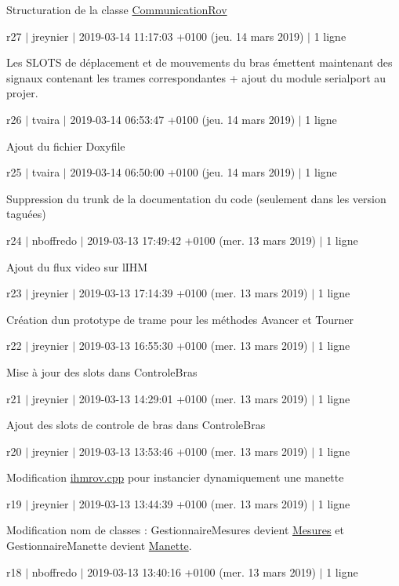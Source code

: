 Structuration de la classe \hyperlink{class_communication_rov}{Communication\+Rov}

r27 $\vert$ jreynier $\vert$ 2019-\/03-\/14 11\+:17\+:03 +0100 (jeu. 14 mars 2019) $\vert$ 1 ligne

Les S\+L\+O\+TS de déplacement et de mouvements du bras émettent maintenant des signaux contenant les trames correspondantes + ajout du module serialport au projer.

r26 $\vert$ tvaira $\vert$ 2019-\/03-\/14 06\+:53\+:47 +0100 (jeu. 14 mars 2019) $\vert$ 1 ligne

Ajout du fichier Doxyfile

r25 $\vert$ tvaira $\vert$ 2019-\/03-\/14 06\+:50\+:00 +0100 (jeu. 14 mars 2019) $\vert$ 1 ligne

Suppression du trunk de la documentation du code (seulement dans les version taguées)

r24 $\vert$ nboffredo $\vert$ 2019-\/03-\/13 17\+:49\+:42 +0100 (mer. 13 mars 2019) $\vert$ 1 ligne

Ajout du flux video sur l\textquotesingle{}I\+HM

r23 $\vert$ jreynier $\vert$ 2019-\/03-\/13 17\+:14\+:39 +0100 (mer. 13 mars 2019) $\vert$ 1 ligne

Création d\textquotesingle{}un prototype de trame pour les méthodes Avancer et Tourner

r22 $\vert$ jreynier $\vert$ 2019-\/03-\/13 16\+:55\+:30 +0100 (mer. 13 mars 2019) $\vert$ 1 ligne

Mise à jour des slots dans Controle\+Bras

r21 $\vert$ jreynier $\vert$ 2019-\/03-\/13 14\+:29\+:01 +0100 (mer. 13 mars 2019) $\vert$ 1 ligne

Ajout des slots de controle de bras dans Controle\+Bras

r20 $\vert$ jreynier $\vert$ 2019-\/03-\/13 13\+:53\+:46 +0100 (mer. 13 mars 2019) $\vert$ 1 ligne

Modification \hyperlink{ihmrov_8cpp}{ihmrov.\+cpp} pour instancier dynamiquement une manette

r19 $\vert$ jreynier $\vert$ 2019-\/03-\/13 13\+:44\+:39 +0100 (mer. 13 mars 2019) $\vert$ 1 ligne

Modification nom de classes \+: Gestionnaire\+Mesures devient \hyperlink{class_mesures}{Mesures} et Gestionnaire\+Manette devient \hyperlink{class_manette}{Manette}.

r18 $\vert$ nboffredo $\vert$ 2019-\/03-\/13 13\+:40\+:16 +0100 (mer. 13 mars 2019) $\vert$ 1 ligne

